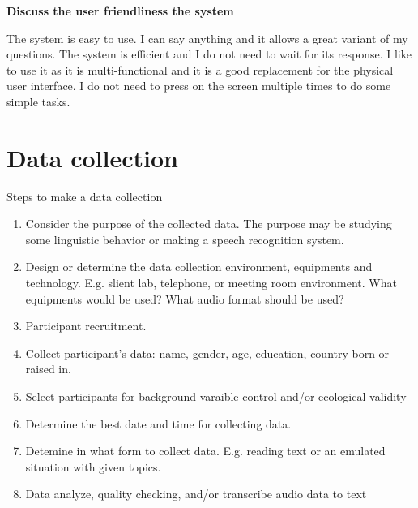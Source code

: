 \documentclass[12pt]{article}
\newenvironment{problem}[2][Problem]{\begin{trivlist}
\item[\hskip \labelsep {\bfseries #1}\hskip \labelsep {\bfseries #2.}]}{\end{trivlist}}
\begin{document}
\begin{problem}{3.3}
    \textbf{Discuss the user friendliness the system}

    The system is easy to use. 
    I can say anything and it allows a great variant of my questions. 
    The system is efficient and I do not need to wait for its response. 
    I like to use it as it is multi-functional and it is a good replacement 
    for the physical user interface. 
    I do not need to press on the screen multiple times to do some simple tasks.

\end{problem}

\pagebreak
\section{Data collection}
\begin{problem}{4.1}
    Steps to make a data collection
    \begin{enumerate}
        \item Consider the purpose of the collected data. The purpose may be
        studying some linguistic behavior or making a speech recognition system.
        \item Design or determine the data collection environment, equipments and technology.
        E.g. slient lab, telephone, or meeting room environment.
        What equipments would be used? What audio format should be used?
        \item Participant recruitment.
        \item Collect participant's data: name, gender, age, education, country born or raised in.
        \item Select participants for background varaible control and/or ecological validity
        \item Determine the best date and time for collecting data.
        \item Detemine in what form to collect data.
        E.g. reading text or an emulated situation with given topics.
        \item Data analyze, quality checking, and/or transcribe audio data to text
    \end{enumerate}
\end{problem}
\end{document}

